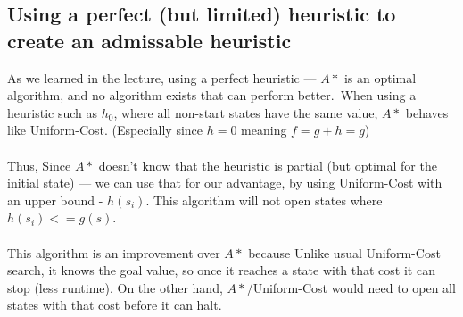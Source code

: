 \documentclass{article}
\begin{document}
\subsection*{Using a perfect (but limited) heuristic to create an admissable heuristic}
As we learned in the lecture, using a perfect heuristic --- $A*$ is an optimal algorithm, and no algorithm exists that can perform better.\ 
When using a heuristic such as $h_0$, where all non-start states have the same value, $A*$ behaves like Uniform-Cost. (Especially since $h=0$ meaning $f=g+h=g$)
\\~\\
Thus, Since $A*$ doesn't know that the heuristic is partial (but optimal for the initial state) --- we can use that for our advantage, by using Uniform-Cost with an upper bound - $h(s_i)$. This algorithm will not open states where $h(s_i) <= g(s)$.
\\~\\
This algorithm is an improvement over $A*$ because Unlike usual Uniform-Cost search, it knows the goal value, so once it reaches a state with that cost it can stop (less runtime). On the other hand, $A*$/Uniform-Cost would need to open all states with that cost before it can halt.
\end{document}
